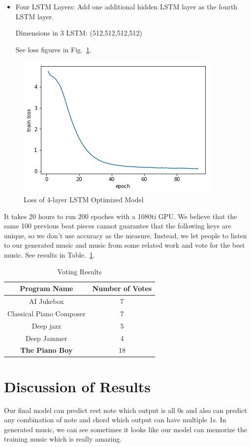 \documentclass[conference]{IEEEtran}
\begin{document}
\begin{itemize}
\item Four LSTM Layers: Add one additional hidden LSTM layer as the fourth LSTM layer. 

Dimensions in 3 LSTM: (512,512,512,512)

See loss figures in Fig.~\ref{fig3}.
\end{itemize}

\begin{figure}[htbp]
\centerline{\includegraphics[scale=0.6]{log_4lstm.png}}
\caption{Loss of 4-layer LSTM Optimized Model}
\label{fig3}
\end{figure}


It takes 20 hours to run 200 epoches with a 1080ti GPU.
We believe that the same 100 previous beat pieces cannot guarantee that the following keys are unique, so we don't use accuracy as the measure. Instead, we let people to listen to our generated music and music from some related work and vote for the best music. See results in Table.~\ref{tab1}.

\begin{table}[htbp]
\caption{Voting Results}
\begin{center}
\begin{tabular}{|c|c|}
\hline
Program Name& Number of Votes\\
\hline
AI Jukebox& 7\\
Classical Piano Composer& 7\\
Deep jazz& 5\\
Deep Jammer& 4\\
\textbf{The Piano Boy}& 18\\
\hline
\end{tabular}
\label{tab1}
\end{center}
\end{table}


\section{Discussion of Results}
Our final model can predict rest note which output is all 0s and also can predict any combination of note and chord which output can have multiple 1s. In generated music, we can see sometimes it looks like our model can memorize the training music which is really amazing.
\end{document}
